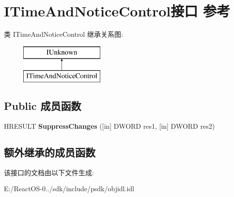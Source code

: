 \hypertarget{interface_i_time_and_notice_control}{}\section{I\+Time\+And\+Notice\+Control接口 参考}
\label{interface_i_time_and_notice_control}
类 I\+Time\+And\+Notice\+Control 继承关系图\+:\begin{figure}[H]
\begin{center}
\leavevmode
\includegraphics[height=2.000000cm]{interface_i_time_and_notice_control}
\end{center}
\end{figure}
\subsection*{Public 成员函数}
\begin{DoxyCompactItemize}
\item 
\mbox{\label{interface_i_time_and_notice_control_a2af284137d0fbb0dfa75c1258b5128fc}} 
H\+R\+E\+S\+U\+LT {\bfseries Suppress\+Changes} (\mbox{[}in\mbox{]} D\+W\+O\+RD res1, \mbox{[}in\mbox{]} D\+W\+O\+RD res2)
\end{DoxyCompactItemize}
\subsection*{额外继承的成员函数}


该接口的文档由以下文件生成\+:\begin{DoxyCompactItemize}
\item 
E\+:/\+React\+O\+S-\/0../sdk/include/psdk/objidl.\+idl\end{DoxyCompactItemize}
